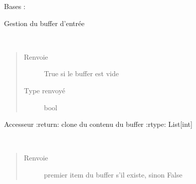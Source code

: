 \documentclass[letterpaper,10pt,french]{sphinxmanual}
\begin{document}
\begin{fulllineitems}
\label{\detokenize{executeurcomponents:executeurcomponents.BufferComponent}}
Bases : {\hyperref[\detokenize{executeurcomponents:executeurcomponents.BaseComponent}]{}}

Gestion du buffer d’entrée

\begin{fulllineitems}
\label{\detokenize{executeurcomponents:executeurcomponents.BufferComponent.empty}}~\begin{quote}\begin{description}
\item[{Renvoie}] \leavevmode
True si le buffer est vide

\item[{Type renvoyé}] \leavevmode
bool

\end{description}\end{quote}

\end{fulllineitems}


\begin{fulllineitems}
\label{\detokenize{executeurcomponents:executeurcomponents.BufferComponent.list}}
Accesseur
:return: clone du contenu du buffer
:rtype: List{[}int{]}

\end{fulllineitems}


\begin{fulllineitems}
\label{\detokenize{executeurcomponents:executeurcomponents.BufferComponent.read}}~\begin{quote}\begin{description}
\item[{Renvoie}] \leavevmode
premier item du buffer s’il existe, sinon False


\end{description}
\end{quote}
\end{fulllineitems}
\end{fulllineitems}
\end{document}
